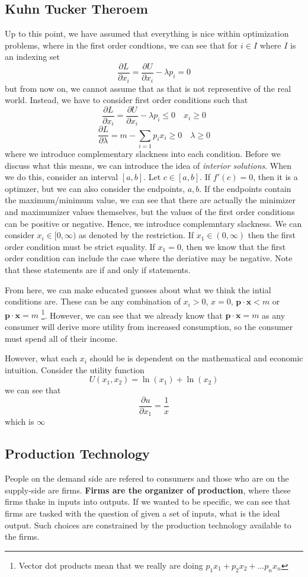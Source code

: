\documentclass[12pt]{article}
\begin{document}
\subsection{Kuhn Tucker Theroem}
Up to this point, we have assumed that everything is nice within optimization problems, where in the first order condtions, we can see that for $i \in I$ where $I$ is an indexing set
\[
\frac{\partial L}{\partial x_i} = \frac{\partial U}{\partial x_i} - \lambda p_i = 0
\]
but from now on, we cannot assume that as that is not representive of the real world. Instead, we have to consider first order conditions such that
\[
\frac{\partial L}{\partial x_i} =  \frac{\partial U}{\partial x_i} - \lambda p_i \leq 0 \quad x_i \geq 0
\] 
\[
\frac{\partial L}{\partial \lambda} = m - \sum_{i=1} p_i x_i \geq 0 \quad \lambda \geq 0 
\]
where we introduce complementary slackness into each condition. Before we discuss what this means, we can introduce the idea of \emph{interior solutions}. When we do this, consider an interval $[a,b]$. Let $c \in [a,b]$. If $f'(c) = 0$, then it is a optimzer, but we can also consider the endpoints, $a,b$. If the endpoints contain the maximum/minimum value, we can see that there are actually the minimizer and maximumizer values themselves, but the values of the first order conditions can be positive or negative. Hence, we introduce complemntary slackness. We can consider $x_i \in [0, \infty)$ as denoted by the restriction. If $x_1 \in (0,\infty)$ then the first order condition must be strict equality. If $x_1 = 0$, then we know that the first order condition can include the case where the deriative may be negative. Note that these statements are if and only if statements. 


From here, we can make educated guesses about what we think the intial conditions are. These can be any combination of $x_i > 0$, $x = 0$, $\mathbf{p} \cdot \mathbf{x} < m$ or $\mathbf{p} \cdot \mathbf{x} = m$ \footnote{Vector dot products mean that we really are doing $p_1 x_1 + p_2 x_2 + \dots p_n x_n$}. However, we can see that we already know that $\mathbf{p} \cdot \mathbf{x} = m$ as any consumer will derive more utility from increased consumption, so the consumer must spend all of their income. 


However, what each $x_i$ should be is dependent on the mathematical and economic intuition. Consider the utility function
\[
U(x_1, x_2) = \ln(x_1) + \ln(x_2)
\]
we can see that 
\[
\frac{\partial u}{\partial x_1} = \frac{1}{x} 
\]
which is $\infty$ 
\subsection{Production Technology}
People on the demand side are refered to consumers and those who are on the supply-side are firms. \textbf{Firms are the organizer of production}, where these firms thake in inputs into outputs. If we wanted to be specific, we can see that firms are tasked with the question of given a set of inputs, what is the ideal output. Such choices are constrained by the production technology available to the firms.  
\end{document}
